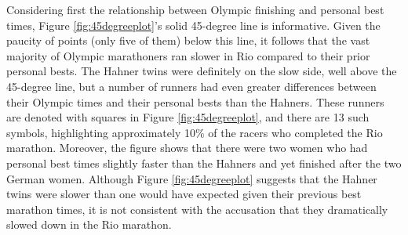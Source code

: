 \documentclass[12pt,titlepage]{article}
\begin{document}
Considering first the relationship between Olympic finishing and
personal best times, Figure \ref{fig:45degreeplot}'s solid 45-degree
line is informative.  Given the paucity of points (only five of them)
below this line, it follows that the vast majority of Olympic
marathoners ran slower in Rio compared to their prior personal bests.
The Hahner twins were definitely on the slow side, well above the
45-degree line, but a number of runners had even greater differences
between their Olympic times and their personal bests than the Hahners.
These runners are denoted with squares in Figure
\ref{fig:45degreeplot}, and there are 13 such symbols, highlighting
approximately 10\% of the racers who completed the Rio marathon.
Moreover, the figure shows that there were two women who had personal
best times slightly faster than the Hahners and yet finished after the
two German women.  Although Figure \ref{fig:45degreeplot} suggests
that the Hahner twins were slower than one would have expected given
their previous best marathon times, it is not consistent with the
accusation that they dramatically slowed down in the Rio marathon.

\end{document}
